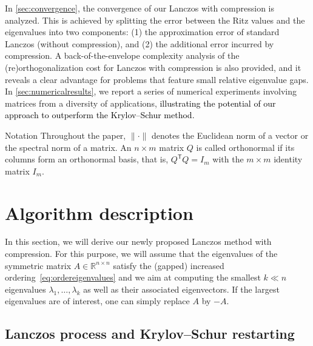 \documentclass{siamart190516}
\newcommand{\Ttran}{\mathsf{T}}
\newcommand{\R}{\mathbb{R}}
\providecommand{\edit}[1]{\textcolor{black}{#1}}
\begin{document}
In \cref{sec:convergence}, the convergence of our Lanczos with compression is analyzed. This is achieved by splitting the error between the Ritz values and the eigenvalues into two components: (1) the approximation error of standard Lanczos (without compression), and (2) the additional error incurred by compression. 
A back-of-the-envelope complexity analysis of the (re)orthogonalization cost for Lanczos with compression is also provided, and it reveals a clear advantage for problems that feature small relative eigenvalue gaps. 
In \cref{sec:numericalresults}, we report a series of numerical experiments involving matrices from a diversity of applications, \edit{illustrating the potential of our approach to outperform the Krylov--Schur method.} 

\begin{paragraph}{Notation} Throughout the paper, $\|\cdot\|$ denotes the Euclidean norm of a vector or the spectral norm of a matrix. An $n\times m$ matrix $Q$ is called orthonormal if its columns form an orthonormal basis, that is, $Q^\Ttran Q = I_m$ with the $m\times m$ identity matrix $I_m$.
\end{paragraph}

\section{Algorithm description}


In this section, we will derive our newly proposed Lanczos method with compression. For this purpose, 
 we will assume that the eigenvalues of the symmetric matrix $A\in\R^{n\times n}$ satisfy the (gapped) increased ordering~\eqref{eq:ordereigenvalues} and we aim at computing the smallest $k \ll n$ eigenvalues $\lambda_1,\ldots,\lambda_k$ as well as their associated eigenvectors. If the largest eigenvalues are of interest, one can simply replace $A$ by $-A$.

\subsection{Lanczos process and Krylov--Schur restarting}
\end{document}
